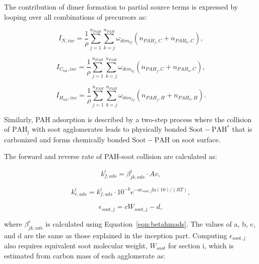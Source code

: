 The contribution of dimer formation to partial source terms is expressed by looping over all combinations of precursors as:

\begin{equation}
	I_{N,{inc}} = 
	\frac{1}{\rho}
	\sum_{j=1}^{n_{PAH}} \sum_{k=j}^{n_{PAH}}  \omega_{dim_{kj}} 
	\left(
	n_{PAH_j,C}+n_{PAH_k,C}
	\right),
	\label{eqn:IN_inc}
\end{equation}

\begin{equation}
	I_{C_{tot},{inc}} = 
	\frac{1}{\rho}
	\sum_{j=1}^{n_{PAH}} \sum_{k=j}^{n_{PAH}}  \omega_{dim_{kj}} 
	\left(
	n_{PAH_j,C}+n_{PAH_k,C}
	\right),
	\label{eqn:ICtot_inc}
\end{equation}

\begin{equation}
	I_{H_{tot},{inc}} = 
	\frac{1}{\rho}
	\sum_{j=1}^{n_{PAH}} \sum_{k=j}^{n_{PAH}}  \omega_{dim_{kj}} 
	\left(
	n_{PAH_j,H}+n_{PAH_k,H}
	\right).
	\label{eqn:IHtot_inc}
\end{equation}

Similarly, PAH adsorption is described by a two-step process where the collision of $\mathrm{PAH_j}$ with soot agglomerates leads to physically bonded $\mathrm{Soot-PAH^*}$ that is carbonized and forms chemically bonded $\mathrm{Soot-PAH}$ on soot surface.



The forward and reverse rate of PAH-soot collision are calculated as:

\begin{equation}
	k^i_{f,ads}=\beta^i_{jk,ads}\cdot Av,
	\label{eqn:kfads_reacdim}
\end{equation}

\begin{equation}
	k^i_{r,ads}=k^i_{f,ads}\cdot10^{-b}e^{-a\epsilon_{soot,j} \mathrm{ln}(10)/(RT)},
	\label{eqn:krads_reacdim}
\end{equation}

\begin{equation}
	\epsilon_{soot,j} = cW_{soot,j} - d,
	\label{eqn:epsilonads_reacdim}
\end{equation}

\noindent where $\beta^i_{jk,ads}$ is calculated using Equation~\eqref{eqn:betahmads}. The values of a, b, c, and d are the same as those explained in the inception part. Computing ${\epsilon_{soot,j}}$ also requires equivalent soot molecular weight, ${W_{soot}}$ for section i, which is estimated from carbon mass of each agglomerate as:

